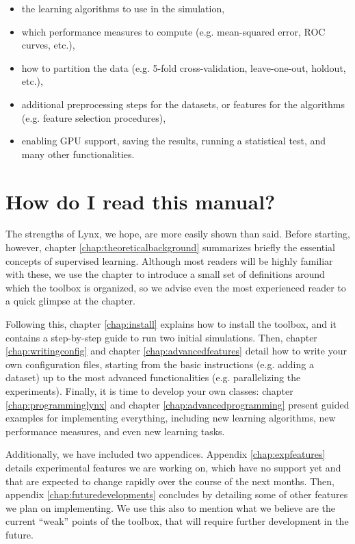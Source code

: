 \begin{itemize}
\item the learning algorithms to use in the simulation,
\item which performance measures to compute (e.g. mean-squared error, ROC curves, etc.),
\item how to partition the data (e.g. 5-fold cross-validation, leave-one-out, holdout, etc.),
\item additional preprocessing steps for the datasets, or features for the algorithms (e.g. feature selection procedures),
\item enabling GPU support, saving the results, running a statistical test, and many other functionalities.
\end{itemize}

\section*{How do I read this manual?}

The strengths of Lynx, we hope, are more easily shown than said. Before starting, however, chapter \ref{chap:theoreticalbackground} summarizes briefly the essential concepts of supervised learning. Although most readers will be highly familiar with these, we use the chapter to introduce a small set of definitions around which the toolbox is organized, so we advise even the most experienced reader to a quick glimpse at the chapter.

Following this, chapter \ref{chap:install} explains how to install the toolbox, and it contains a step-by-step guide to run two initial simulations. Then, chapter \ref{chap:writingconfig} and chapter \ref{chap:advancedfeatures} detail how to write your own configuration files, starting from the basic instructions (e.g. adding a dataset) up to the most advanced functionalities (e.g. parallelizing the experiments). Finally, it is time to develop your own classes: chapter \ref{chap:programminglynx} and chapter \ref{chap:advancedprogramming} present guided examples for implementing everything, including new learning algorithms, new performance measures, and even new learning tasks.

Additionally, we have included two appendices. Appendix \ref{chap:expfeatures} details experimental features we are working on, which have no support yet and that are expected to change rapidly over the course of the next months. Then, appendix \ref{chap:futuredevelopments} concludes by detailing some of other features we plan on implementing. We use this also to mention what we believe are the current ``weak'' points of the toolbox, that will require further development in the future.

